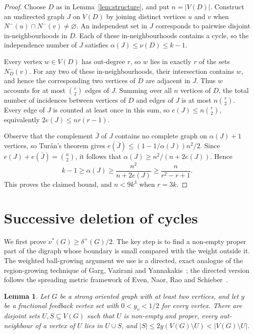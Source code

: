 \documentclass[10pt,a4paper]{article}
\newtheorem{lemma}[theorem]{Lemma}
\numberwithin{equation}{section}
\newcommand{\jbjcomment}[1]{\textcolor{blue}{JBJ: #1}}
\begin{document}
\begin{proof}
Choose $D$ as in Lemma~\ref{lem:structure}, and put $n=|V(D)|$.
Construct an undirected graph $J$ on $V(D)$ by joining distinct vertices
$u$ and $v$ when $N^-(u)\cap N^-(v)\ne\varnothing$.
An independent set in $J$ corresponds to pairwise disjoint
in-neighbourhoods in $D$. Each of these in-neighbourhoods contains
a cycle, so the independence number of $J$ satisfies
$\alpha(J)\le\nu(D)\le k-1$.

Every vertex $w\in V(D)$ has out-degree $r$, so $w$ lies in exactly $r$
of the sets $N_D^-(v)$. For any two of these in-neighbourhoods, their
intersection contains $w$, and hence the corresponding two vertices of
$D$ are adjacent in $J$. Thus $w$ accounts for at most $\binom r2$
edges of $J$. Summing over all $n$ vertices of $D$, the total number of
incidences between vertices of $D$ and edges of $J$ is at most
$n\binom r2$. Every edge of $J$ is counted at least once in this sum, so
$e(J)\le n\binom r2$, equivalently $2e(J)\le nr(r-1)$.

Observe that the complement
$\bar{J}$ of $J$ contains no complete graph on $\alpha(J)+1$ vertices, so
Tur\'an's theorem gives $e(\bar{J})\le(1-1/\alpha(J))n^2/2$.
Since $e(J)+e(\bar{J})=\binom n2$, it follows that
$\alpha(J)\ge n^2/(n+2e(J))$. Hence
$$
 k-1\ge\alpha(J)\ge\frac{n^2}{n+2e(J)}\ge\frac{n}{r^2-r+1}.
$$
This proves the claimed bound, and $n<9k^3$ when $r=3k$.
\end{proof}


\section{Successive deletion of cycles}\label{sec:iteration}


We first prove $\nu^\ast(G)\ge\delta^+(G)/2$. The key step is to find a non-empty
proper part of the digraph whose boundary  %
is small compared with the
weight outside it. The weighted ball-growing argument we use is a
directed, exact analogue of the region-growing technique of Garg,
Vazirani and Yannakakis~\cite{gargSJC25}; the directed version follows the
spreading metric framework of Even, Naor, Rao and Schieber~\cite{evenJACM47}.



\begin{lemma}\label{lem:boundary}
Let $G$ be a strong oriented graph   
with at least two vertices, and let $y$ be a
fractional feedback vertex set with $0<y_v<1/2$ for every vertex.
There are disjoint sets $U,S\subseteq V(G)$ such that $U$ is non-empty
and proper, every out-neighbour of a vertex of $U$ lies in $U\cup S$,
and $|S|\le 2y(V(G)\setminus U)< |V(G)\setminus U|$.
\end{lemma}
\end{document}
